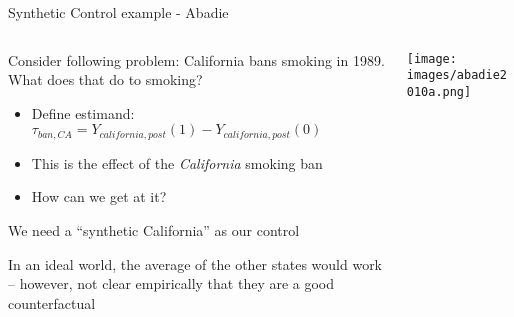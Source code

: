 \documentclass[notes,11pt, aspectratio=169]{beamer}
\newenvironment{wideitemize}{\itemize\addtolength{\itemsep}{10pt}}{\enditemize}
\begin{document}
\begin{frame}{Synthetic Control example - Abadie }
  \begin{columns}[T] %
    \begin{column}{0.5\textwidth}
      \begin{wideitemize}
      \item Consider following problem: California bans smoking in 1989. What does that do to smoking?
        \begin{itemize}
        \item Define estimand: $\tau_{ban,CA} = Y_{california, post}(1) - Y_{california, post}(0)$
        \item This is the effect of the \emph{California} smoking ban 
        \item How can we get at it? 
        \end{itemize}
      \item We need a ``synthetic California'' as our control
      \item In an ideal world, the average of the other states would
        work -- however, not clear empirically that they are a good
        counterfactual
      \end{wideitemize}
    \end{column}%
    \hfill%
    \begin{column}{.5\textwidth}
      \texttt{[image: images/abadie2010a.png]}
    \end{column}%
  \end{columns}
\end{frame}
\end{document}
